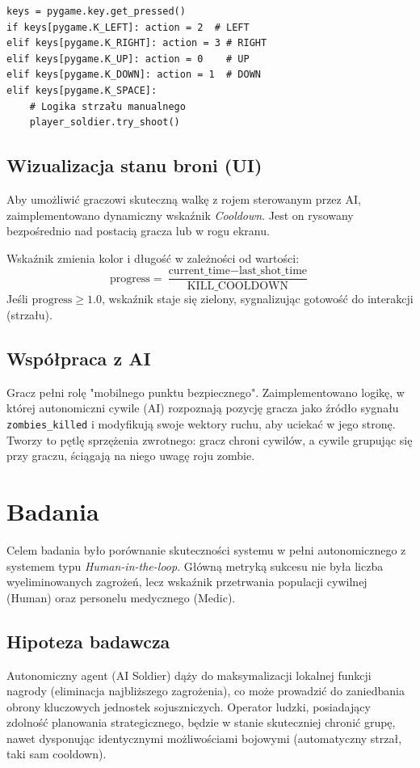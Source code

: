 \documentclass[12pt,a4paper]{article}
\begin{document}
\begin{verbatim}
keys = pygame.key.get_pressed()
if keys[pygame.K_LEFT]: action = 2  # LEFT
elif keys[pygame.K_RIGHT]: action = 3 # RIGHT
elif keys[pygame.K_UP]: action = 0    # UP
elif keys[pygame.K_DOWN]: action = 1  # DOWN
elif keys[pygame.K_SPACE]: 
    # Logika strzału manualnego
    player_soldier.try_shoot()
\end{verbatim}

\subsection{Wizualizacja stanu broni (UI)}
Aby umożliwić graczowi skuteczną walkę z rojem sterowanym przez AI,
zaimplementowano dynamiczny wskaźnik \textit{Cooldown}. Jest on rysowany
bezpośrednio nad postacią gracza lub w rogu ekranu.

Wskaźnik zmienia kolor i długość w zależności od wartości: $$ \text{progress} =
    \frac{\text{current\_time} - \text{last\_shot\_time}}{\text{KILL\_COOLDOWN}} $$
Jeśli $\text{progress} \ge 1.0$, wskaźnik staje się zielony, sygnalizując
gotowość do interakcji (strzału).

\subsection{Współpraca z AI}
Gracz pełni rolę "mobilnego punktu bezpiecznego". Zaimplementowano logikę, w
której autonomiczni cywile (AI) rozpoznają pozycję gracza jako źródło sygnału
\texttt{zombies\_killed} i modyfikują swoje wektory ruchu, aby uciekać w jego
stronę. Tworzy to pętlę sprzężenia zwrotnego: gracz chroni cywilów, a cywile
grupując się przy graczu, ściągają na niego uwagę roju zombie.

\newpage

\section{Badania}

Celem badania było porównanie skuteczności systemu w pełni autonomicznego z
systemem typu \textit{Human-in-the-loop}. Główną metryką sukcesu nie była
liczba wyeliminowanych zagrożeń, lecz wskaźnik przetrwania populacji cywilnej
(Human) oraz personelu medycznego (Medic).

\subsection{Hipoteza badawcza}
Autonomiczny agent (AI Soldier) dąży do maksymalizacji lokalnej funkcji nagrody
(eliminacja najbliższego zagrożenia), co może prowadzić do zaniedbania obrony
kluczowych jednostek sojuszniczych. Operator ludzki, posiadający zdolność
planowania strategicznego, będzie w stanie skuteczniej chronić grupę, nawet
dysponując identycznymi możliwościami bojowymi (automatyczny strzał, taki sam
cooldown).
\end{document}
